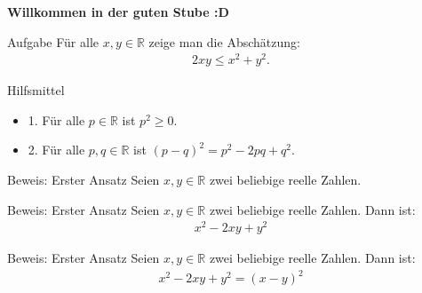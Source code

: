 \documentclass[10pt]{beamer}
\title{}
\author{Artur's Mathematikstübchen}
\date{}
\def\bR{\mathbb{R}}
\begin{document}

\begin{frame}
    \begin{center}
        \textbf{\huge Willkommen in der guten Stube \newline \newline :D}
    \end{center}
\end{frame}




\begin{frame}
    \begin{alertblock}{Aufgabe}
        Für alle \( x, y \in \bR \) zeige man die Abschätzung:
        \begin{align*}
            2xy
            \leq x^{2} + y^{2}.
        \end{align*}
    \end{alertblock}
\end{frame}



\begin{frame}{Hilfsmittel}
    \begin{itemize}
        \item<1-> 1. Für alle \( p \in \bR \) ist \( p^{2} \geq 0 \).
        \item<2-> 2. Für alle \( p, q \in \bR \) ist \( \left( p - q \right)^{2}
            = p^{2} - 2pq + q^{2}. \)
    \end{itemize}
\end{frame}



\begin{frame}{Beweis: Erster Ansatz}
    Seien \( x, y \in \bR \) zwei beliebige reelle Zahlen.
\end{frame}



\begin{frame}{Beweis: Erster Ansatz}
    Seien \( x, y \in \bR \) zwei beliebige reelle Zahlen. Dann ist:
    \begin{align*}
        x^{2} - 2xy + y^{2}
    \end{align*}
\end{frame}



\begin{frame}{Beweis: Erster Ansatz}
    Seien \( x, y \in \bR \) zwei beliebige reelle Zahlen. Dann ist:
    \begin{align*}
        x^{2} - 2xy + y^{2}
        = \left( x - y \right)^{2}  
    \end{align*}
\end{frame}
\end{document}
